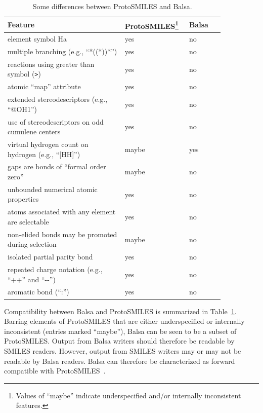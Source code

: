 \documentclass{article}
\def\ttt{\texttt}
\begin{document}
\begin{table}
\begin{minipage}{\textwidth}
\renewcommand*\footnoterule{}
    \caption{Some differences between ProtoSMILES and Balsa.}
    \centering
    \begin{tabular}{p{0.50\linewidth} p{0.20\linewidth} p{0.15\linewidth}}
        \hline
        Feature & ProtoSMILES\footnote{Values of \enquote{maybe} indicate underspecified and/or internally inconsistent features.} & Balsa \\
        \hline
        element symbol Ha & yes & no \\
        multiple branching (e.g., \enquote{*((*))*}) & yes & no \\
        reactions using greater than symbol (\ttt{>}) & yes & no \\
        atomic \enquote{map} attribute & yes & no \\
        extended stereodescriptors (e.g., \enquote{@OH1}) & yes & no \\
        use of stereodescriptors on odd cumulene centers & yes & no \\
        virtual hydrogen count on hydrogen (e.g., \enquote{[HH]}) & maybe & yes \\
        gaps are bonds of \enquote{formal order zero} & maybe & no \\
        unbounded numerical atomic properties & yes & no \\
        atoms associated with any element are selectable & yes & no \\
        non-elided bonds may be promoted during selection & maybe & no \\
        isolated partial parity bond & yes & no \\
        repeated charge notation (e.g., \enquote{++} and \enquote{-{}-}) & yes & no \\
        aromatic bond (\enquote{:}) & yes & no \\
        \hline
    \end{tabular}
    \label{table:feature-comparison}
\end{minipage}
\end{table}

Compatibility between Balsa and ProtoSMILES is summarized in Table~\ref{table:feature-comparison}. Barring elements of ProtoSMILES that are either underspecified or internally inconsistent (entries marked \enquote{maybe}), Balsa can be seen to be a subset of ProtoSMILES. Output from Balsa writers should therefore be readable by SMILES readers. However, output from SMILES writers may or may not be readable by Balsa readers. Balsa can therefore be characterized as forward compatible with ProtoSMILES~\cite{extendingVersioningLanguages}.
\end{document}

